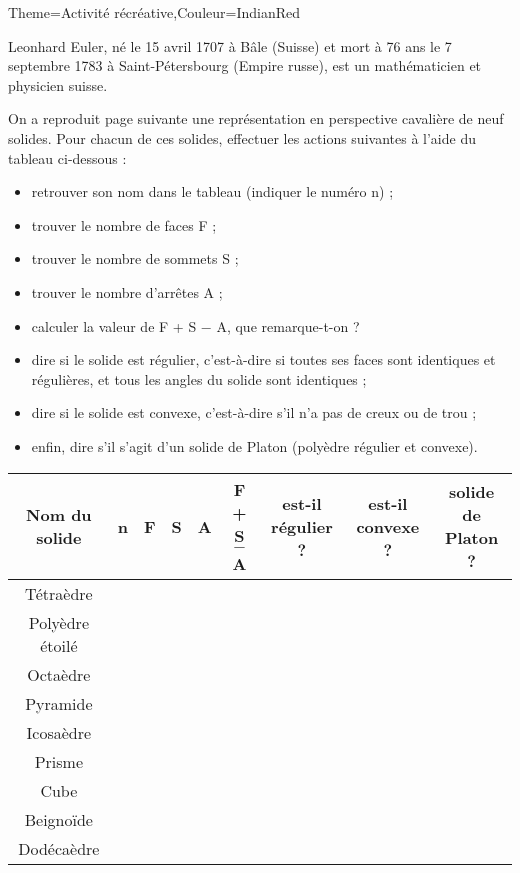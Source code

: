 \begin{Maquette}[Cours]{Theme={Activité récréative},Couleur={IndianRed}}
    

      Leonhard Euler, né le 15 avril 1707 à Bâle (Suisse) et mort à 76 ans le 7 septembre 1783 à Saint-Pétersbourg (Empire russe), est un mathématicien et physicien suisse. \par \bigskip
      On a reproduit page suivante une représentation en perspective cavalière de neuf solides. Pour chacun de ces solides, effectuer les actions suivantes à l'aide du tableau ci-dessous :
      \begin{itemize}
         \item retrouver son nom dans le tableau (indiquer le numéro n) ;
         \item trouver le nombre de faces F ;
         \item trouver le nombre de sommets S ;
         \item trouver le nombre d'arrêtes A ;
         \item calculer la valeur de F + S $-$ A, que remarque-t-on ?
         \item dire si le solide est régulier, c'est-à-dire si toutes ses faces sont identiques et régulières, et tous les angles du solide sont identiques ;
         \item dire si le solide est convexe, c'est-à-dire s'il n'a pas de \og creux \fg{} ou de trou ;
         \item enfin, dire s'il s'agit d'un solide de Platon (polyèdre régulier et convexe).
      \end{itemize}
      \bigskip
      \begin{center}   
         {
         \begin{tabular}{|c|*{4}{C{0.9}|}*{4}{C{1.5}|}}
            \hline
            Nom du solide & n & F & S & A & F + S $-$ A & est-il régulier ? & est-il convexe ? & solide de Platon ? \\
            \hline
            Tétraèdre & & & & & & & & \\
            \hline
            Polyèdre étoilé & & & & & & & & \\
            \hline
            Octaèdre & & & & & & & & \\
            \hline
            Pyramide & & & & & & & & \\
            \hline
            Icosaèdre & & & & & & & & \\
            \hline
            Prisme & & & & & & & & \\
            \hline
            Cube & & & & & & & & \\
            \hline
            Beignoïde  & & & & & & & & \\
            \hline
            Dodécaèdre & & & & & & & & \\
            \hline    
         \end{tabular}}
      \end{center}
   

\end{Maquette}
